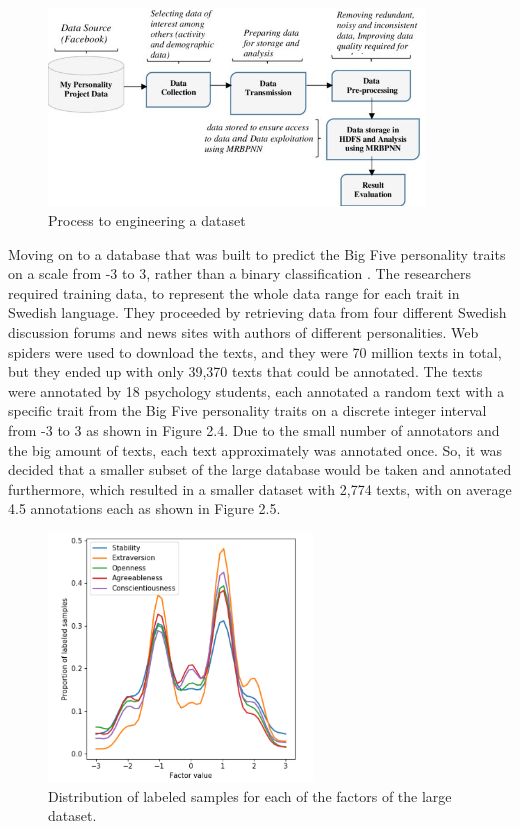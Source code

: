 \begin{figure}[H]
\centering
\includegraphics[width=10cm]{Figure3}
\caption{Process to engineering a dataset}
\end{figure}
Moving on to a database that was built to predict the Big Five personality traits on a scale from -3 to 3, rather than a binary classification \cite{akrami2019automatic}. The researchers required training data, to represent the whole data range for each trait in Swedish language. They proceeded by retrieving data from four different Swedish discussion forums and news sites with authors of different personalities. Web spiders were used to download the texts, and they were 70 million texts in total, but they ended up with only 39,370 texts that could be annotated. The texts were annotated by 18 psychology students, each annotated a random text with a specific trait from the Big Five personality traits on a discrete integer interval from -3 to 3 as shown in Figure 2.4. Due to the small number of annotators and the big amount of texts, each text approximately was annotated once. So, it was decided that a smaller subset of the large database would be taken and annotated furthermore, which resulted in a smaller dataset with 2,774 texts, with on average 4.5 annotations each as shown in Figure 2.5.

\begin{figure}[H]
\centering
\includegraphics[width=7cm]{Figure4}
\caption{Distribution of labeled samples for each of the factors of the large dataset.}
\end{figure}


